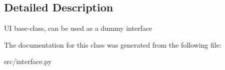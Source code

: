 \subsection{Detailed Description}
\begin{DoxyVerb}UI base-class, can be used as a dummy interface \end{DoxyVerb}
 

The documentation for this class was generated from the following file\+:\begin{DoxyCompactItemize}
\item 
src/interface.\+py\end{DoxyCompactItemize}
